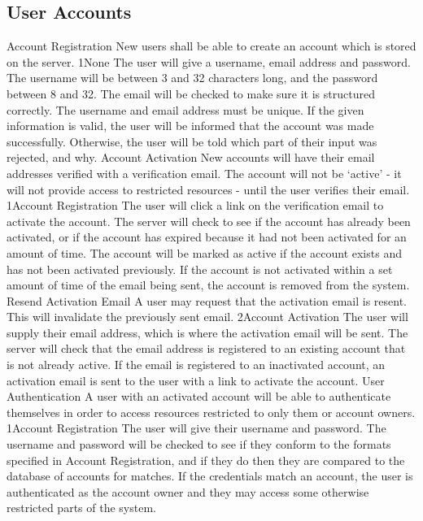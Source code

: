 	\subsection{User Accounts}
		\funcreq
			{Account Registration}
			{New users shall be able to create an account which is stored on the server.}
			{1}{None}
			{The user will give a username, email address and password.}
			{The username will be between 3 and 32 characters long, and the password between 8 and 32. The email will be checked to make sure it is structured correctly. The username and email address must be unique.}
			{If the given information is valid, the user will be informed that the account was made successfully. Otherwise, the user will be told which part of their input was rejected, and why.}
		\funcreq
			{Account Activation}
			{New accounts will have their email addresses verified with a verification email. The account will not be `active' - it will not provide access to restricted resources - until the user verifies their email.}
			{1}{Account Registration}
			{The user will click a link on the verification email to activate the account.}
			{The server will check to see if the account has already been activated, or if the account has expired because it had not been activated for an amount of time.}
			{The account will be marked as active if the account exists and has not been activated previously. If the account is not activated within a set amount of time of the email being sent, the account is removed from the system.}
		\funcreq
			{Resend Activation Email}
			{A user may request that the activation email is resent. This will invalidate the previously sent email.}
			{2}{Account Activation}
			{The user will supply their email address, which is where the activation email will be sent.}
			{The server will check that the email address is registered to an existing account that is not already active.}
			{If the email is registered to an inactivated account, an activation email is sent to the user with a link to activate the account.}
		\funcreq
			{User Authentication}
			{A user with an activated account will be able to authenticate themselves in order to access resources restricted to only them or account owners.}
			{1}{Account Registration}
			{The user will give their username and password.}
			{The username and password will be checked to see if they conform to the formats specified in Account Registration, and if they do then they are compared to the database of accounts for matches.}
			{If the credentials match an account, the user is authenticated as the account owner and they may access some otherwise restricted parts of the system.}
